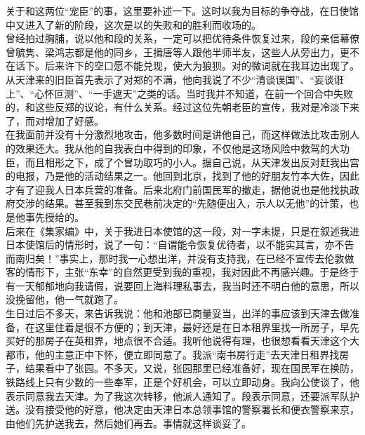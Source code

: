 关于和这两位“宠臣”的事，这里要补述一下。这时以我为目标的争夺战，在日使馆中又进入了新的阶段，这次是以的失败和的胜利而收场的。\\

曾经拍过胸脯，说以他和段的关系，一定可以把优待条件恢复过来，段的亲信幕僚曾毓隽、梁鸿志都是他的同乡，王揖唐等人跟他半师半友，这些人从旁出力，更不在话下。后来许下的空口愿不能兑现，使大为狼狈。对的微词就在我耳边出现了。从天津来的旧臣首先表示了对郑的不满，他向我说了不少“清谈误国”、“妄谈诳上”、“心怀叵测”、“一手遮天”之类的话。当时我并不知道，在前一个回合中失败的，和这些反郑的议论，有什么关系。经过这位先朝老臣的宣传，我对是冷淡下来了，而对增加了好感。\\

在我面前并没有十分激烈地攻击，他多数时间是讲他自己，而这样做法比攻击别人的效果还大。我从他的自我表白中得到的印象，不仅他是这场风险中救驾的大功臣，而且相形之下，成了个冒功取巧的小人。据自己说，从天津发出反对赶我出宫的电报，乃是他的活动结果之一。他回到北京，找到了他的好朋友竹本大佐，因此才有了迎我人日本兵营的准备。后来北府门前国民军的撤走，据他说也是他找执政府交涉的结果。甚至我到东交民巷前决定的“先随便出入，示人以无他”的计策，也是他事先授给的。\\

后来在《集家编》中，关于我进日本使馆的这一段，对一字未提，只是在叙述我进日本使馆后的情形时，说了一句：“自谓能令恢复优待者，以不能实其言，亦不告而南归矣！”事实上，那时我一心想出洋，并没有支持我，在已经不宣传去伦敦做客的情形下，主张“东幸”的自然更受到我的重视，我对因此不再感兴趣。于是终于有一天郁郁地向我请假，说要回上海料理私事去，我当时还不明白他的意思，所以没挽留他，他一气就跑了。\\

生日过后不多天，来告诉我说：他和池部已商量妥当，出洋的事应该到天津去做准备，在这里住着是很不方便的；到天津，最好还是在日本租界里找一所房子，早先买好的那房子在英租界，地点很不合适。我听他说得有理，也很想看看天津这个大都市，他的主意正中下怀，便立即同意了。我派“南书房行走”去天津日租界找房子，结果看中了张园。不多天，又说，张园那里已经准备好，现在国民军在换防，铁路线上只有少数的一些奉军，正是个好机会，可以立即动身。我向公使谈了，他表示同意我去天津。为了我这次转移，他派人通知了。段表示同意，还要派军队护送。没有接受他的好意，他决定由天津日本总领事馆的警察署长和便衣警察来京，由他们先护送我去，然后她们再去。事情就这样谈妥了。\\

